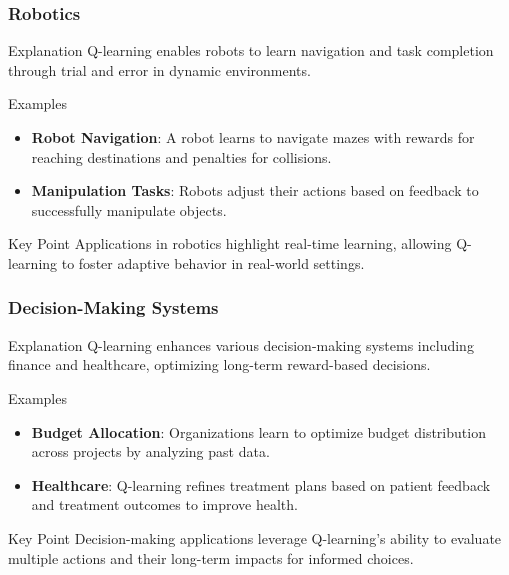 \documentclass{beamer}
\begin{document}
\begin{frame}[fragile]
    \frametitle{Robotics}
    \begin{block}{Explanation}
        Q-learning enables robots to learn navigation and task completion through trial and error in dynamic environments.
    \end{block}
    \begin{exampleblock}{Examples}
        \begin{itemize}
            \item \textbf{Robot Navigation}: A robot learns to navigate mazes with rewards for reaching destinations and penalties for collisions.
            \item \textbf{Manipulation Tasks}: Robots adjust their actions based on feedback to successfully manipulate objects.
        \end{itemize}
    \end{exampleblock}
    \begin{block}{Key Point}
        Applications in robotics highlight real-time learning, allowing Q-learning to foster adaptive behavior in real-world settings.
    \end{block}
\end{frame}

\begin{frame}[fragile]
    \frametitle{Decision-Making Systems}
    \begin{block}{Explanation}
        Q-learning enhances various decision-making systems including finance and healthcare, optimizing long-term reward-based decisions.
    \end{block}
    \begin{exampleblock}{Examples}
        \begin{itemize}
            \item \textbf{Budget Allocation}: Organizations learn to optimize budget distribution across projects by analyzing past data.
            \item \textbf{Healthcare}: Q-learning refines treatment plans based on patient feedback and treatment outcomes to improve health.
        \end{itemize}
    \end{exampleblock}
    \begin{block}{Key Point}
        Decision-making applications leverage Q-learning's ability to evaluate multiple actions and their long-term impacts for informed choices.
    \end{block}
\end{frame}
\end{document}
